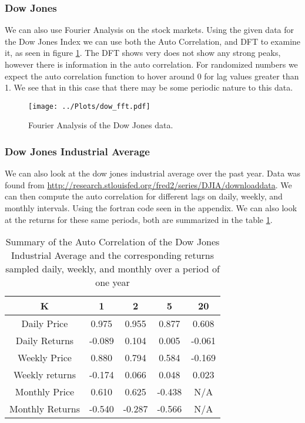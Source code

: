 \documentclass[twocolumn]{myarticle}
\begin{document}
\subsubsection{Dow Jones}
We can also use Fourier Analysis on the stock markets. 
Using the given data for the Dow Jones Index we can use both the Auto Correlation, and DFT to examine it, as seen in figure \ref{fig:dow}. 
The DFT shows very does not show any strong peaks, however there is information in the auto correlation. 
For randomized numbers we expect the auto correlation function to hover around 0 for lag values greater than 1. 
We see that in this case that there may be some periodic nature to this data.

\begin{figure}[ht]
    \centering
    \texttt{[image: ../Plots/dow\_fft.pdf]}
    \caption{Fourier Analysis of the Dow Jones data.}
    \label{fig:dow}
\end{figure}

\subsubsection{Dow Jones Industrial Average}
We can also look at the dow jones industrial average over the past year. 
Data was found from \url{http://research.stlouisfed.org/fred2/series/DJIA/downloaddata}. 
We can then compute the auto correlation for different lags on daily, weekly, and monthly intervals. 
Using the fortran code seen in the appendix. 
We can also look at the returns for these same periods, both are summarized in the table \ref{table:DJA}.
\begin{table}
\begin{tabular}{ccccc}
    \toprule
    K & 1 & 2 & 5 & 20 \\
    \midrule
    Daily Price & 0.975 & 0.955 & 0.877 & 0.608 \\
    Daily Returns & -0.089 & 0.104 & 0.005 & -0.061 \\
    Weekly Price & 0.880 & 0.794 & 0.584 & -0.169 \\
    Weekly returns & -0.174 & 0.066 & 0.048 & 0.023 \\
    Monthly Price & 0.610 & 0.625 & -0.438 & N/A \\
    Monthly Returns & -0.540 & -0.287 & -0.566 & N/A \\
    \bottomrule
\end{tabular}
\caption{Summary of the Auto Correlation of the Dow Jones Industrial Average and the corresponding returns sampled daily, weekly, and monthly over a period of one year}
\label{table:DJA}
\end{table}
\end{document}
